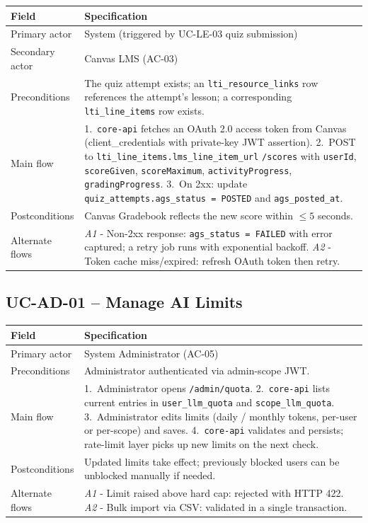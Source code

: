 \begin{longtable}{|p{3.2cm}|p{10.3cm}|}
\hline
\textbf{Field} & \textbf{Specification} \\
\hline
\endhead
Primary actor & System (triggered by UC-LE-03 quiz submission) \\
\hline
Secondary actor & Canvas LMS (AC-03) \\
\hline
Preconditions & The quiz attempt exists; an
    \texttt{lti\_resource\_links} row references the attempt's lesson;
    a corresponding \texttt{lti\_line\_items} row exists. \\
\hline
Main flow &
    1.\ \texttt{core-api} fetches an OAuth 2.0 access token from
    Canvas (client\_credentials with private-key JWT assertion).
    2.\ POST to \texttt{lti\_line\_items.lms\_line\_item\_url}
    \texttt{/scores} with \texttt{userId}, \texttt{scoreGiven},
    \texttt{scoreMaximum}, \texttt{activityProgress},
    \texttt{gradingProgress}.
    3.\ On 2xx: update \texttt{quiz\_attempts.ags\_status =
    POSTED} and \texttt{ags\_posted\_at}. \\
\hline
Postconditions & Canvas Gradebook reflects the new score within
    $\leq 5$ seconds. \\
\hline
Alternate flows &
    \emph{A1} - Non-2xx response: \texttt{ags\_status = FAILED} with
    error captured; a retry job runs with exponential backoff.
    \emph{A2} - Token cache miss/expired: refresh OAuth token then
    retry. \\
\hline
\end{longtable}

\subsection{UC-AD-01 -- Manage AI Limits}

\begin{longtable}{|p{3.2cm}|p{10.3cm}|}
\hline
\textbf{Field} & \textbf{Specification} \\
\hline
\endhead
Primary actor & System Administrator (AC-05) \\
\hline
Preconditions & Administrator authenticated via admin-scope JWT. \\
\hline
Main flow &
    1.\ Administrator opens \texttt{/admin/quota}.
    2.\ \texttt{core-api} lists current entries in
    \texttt{user\_llm\_quota} and \texttt{scope\_llm\_quota}.
    3.\ Administrator edits limits (daily / monthly tokens, per-user
    or per-scope) and saves.
    4.\ \texttt{core-api} validates and persists; rate-limit layer
    picks up new limits on the next check. \\
\hline
Postconditions & Updated limits take effect; previously blocked users
    can be unblocked manually if needed. \\
\hline
Alternate flows &
    \emph{A1} - Limit raised above hard cap: rejected with HTTP 422.
    \emph{A2} - Bulk import via CSV: validated in a single
    transaction. \\
\hline
\end{longtable}

